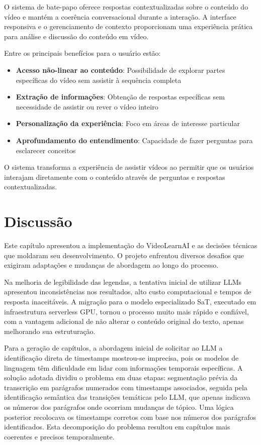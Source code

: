 \documentclass[tcc,capa]{texufpel}
\begin{document}
O sistema de bate-papo oferece respostas contextualizadas sobre o conteúdo do vídeo e mantém a coerência conversacional durante a interação. A interface responsiva e o gerenciamento de contexto proporcionam uma experiência prática para análise e discussão do conteúdo em vídeo.

Entre os principais benefícios para o usuário estão:

\begin{itemize}
    \item \textbf{Acesso não-linear ao conteúdo}: Possibilidade de explorar partes específicas do vídeo sem assistir à sequência completa
    \item \textbf{Extração de informações}: Obtenção de respostas específicas sem necessidade de assistir ou rever o vídeo inteiro
    \item \textbf{Personalização da experiência}: Foco em áreas de interesse particular
    \item \textbf{Aprofundamento do entendimento}: Capacidade de fazer perguntas para esclarecer conceitos
\end{itemize}

O sistema transforma a experiência de assistir vídeos ao permitir que os usuários interajam diretamente com o conteúdo através de perguntas e respostas contextualizadas.



\section{Discussão}

Este capítulo apresentou a implementação do VideoLearnAI e as decisões técnicas que moldaram seu desenvolvimento. O projeto enfrentou diversos desafios que exigiram adaptações e mudanças de abordagem ao longo do processo.

Na melhoria de legibilidade das legendas, a tentativa inicial de utilizar LLMs apresentou inconsistências nos resultados, alto custo computacional e tempos de resposta inaceitáveis. A migração para o modelo especializado SaT, executado em infraestrutura serverless GPU, tornou o processo muito mais rápido e confiável, com a vantagem adicional de não alterar o conteúdo original do texto, apenas melhorando sua estruturação.

Para a geração de capítulos, a abordagem inicial de solicitar ao LLM a identificação direta de timestamps mostrou-se imprecisa, pois os modelos de linguagem têm dificuldade em lidar com informações temporais específicas. A solução adotada dividiu o problema em duas etapas: segmentação prévia da transcrição em parágrafos numerados com timestamps associados, seguida pela identificação semântica das transições temáticas pelo LLM, que apenas indicava os números dos parágrafos onde ocorriam mudanças de tópico. Uma lógica posterior recolocava os timestamps corretos com base nos números dos parágrafos identificados. Esta decomposição do problema resultou em capítulos mais coerentes e precisos temporalmente.
\end{document}
